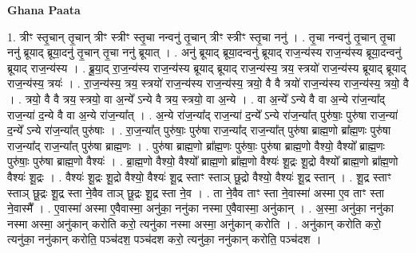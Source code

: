 \documentclass[17pt]{extarticle}
\begin{document}
\textbf{Ghana Paata } \newline

1. त्रीꣳ स्तृ॒चान् तृ॒चान् त्रीꣳ स्त्रीꣳ स्तृ॒चा नन्वनु॑ तृ॒चान् त्रीꣳ स्त्रीꣳ स्तृ॒चा ननु॑ । . तृ॒चा नन्वनु॑ तृ॒चान् तृ॒चा ननु॑ ब्रूयाद् ब्रूया॒दनु॑ तृ॒चान् तृ॒चा ननु॑ ब्रूयात् । . अनु॑ ब्रूयाद् ब्रूया॒दन्वनु॑ ब्रूयाद् राज॒न्य॑स्य राज॒न्य॑स्य ब्रूया॒दन्वनु॑ ब्रूयाद् राज॒न्य॑स्य । . ब्रू॒या॒द् रा॒ज॒न्य॑स्य राज॒न्य॑स्य ब्रूयाद् ब्रूयाद् राज॒न्य॑स्य॒ त्रय॒ स्त्रयो॑ राज॒न्य॑स्य ब्रूयाद् ब्रूयाद् राज॒न्य॑स्य॒ त्रयः॑ । . रा॒ज॒न्य॑स्य॒ त्रय॒ स्त्रयो॑ राज॒न्य॑स्य राज॒न्य॑स्य॒ त्रयो॒ वै वै त्रयो॑ राज॒न्य॑स्य राज॒न्य॑स्य॒ त्रयो॒ वै । . त्रयो॒ वै वै त्रय॒ स्त्रयो॒ वा अ॒न्ये᳚ ऽन्ये वै त्रय॒ स्त्रयो॒ वा अ॒न्ये । . वा अ॒न्ये᳚ ऽन्ये वै वा अ॒न्ये रा॑ज॒न्या᳚द् राज॒न्या॑ द॒न्ये वै वा अ॒न्ये रा॑ज॒न्या᳚त् । . अ॒न्ये रा॑ज॒न्या᳚द् राज॒न्या॑ द॒न्ये᳚ ऽन्ये रा॑ज॒न्या᳚त् पुरु॑षाः॒ पुरु॑षा राज॒न्या॑ द॒न्ये᳚ ऽन्ये रा॑ज॒न्या᳚त् पुरु॑षाः । . रा॒ज॒न्या᳚त् पुरु॑षाः॒ पुरु॑षा राज॒न्या᳚द् राज॒न्या᳚त् पुरु॑षा ब्राह्म॒णो ब्रा᳚ह्म॒णः पुरु॑षा राज॒न्या᳚द् राज॒न्या᳚त् पुरु॑षा ब्राह्म॒णः । . पुरु॑षा ब्राह्म॒णो ब्रा᳚ह्म॒णः पुरु॑षाः॒ पुरु॑षा ब्राह्म॒णो वैश्यो॒ वैश्यो᳚ ब्राह्म॒णः पुरु॑षाः॒ पुरु॑षा ब्राह्म॒णो वैश्यः॑ । . ब्रा॒ह्म॒णो वैश्यो॒ वैश्यो᳚ ब्राह्म॒णो ब्रा᳚ह्म॒णो वैश्यः॑ शू॒द्रः शू॒द्रो वैश्यो᳚ ब्राह्म॒णो ब्रा᳚ह्म॒णो वैश्यः॑ शू॒द्रः । . वैश्यः॑ शू॒द्रः शू॒द्रो वैश्यो॒ वैश्यः॑ शू॒द्र स्ताꣳ स्ताञ् छू॒द्रो वैश्यो॒ वैश्यः॑ शू॒द्र स्तान् । . शू॒द्र स्ताꣳ स्ताञ् छू॒द्रः शू॒द्र स्ता ने॒वैव ताञ् छू॒द्रः शू॒द्र स्ता ने॒व । . ता ने॒वैव ताꣳ स्ता ने॒वास्मा॑ अस्मा ए॒व ताꣳ स्ता ने॒वास्मै᳚ । . ए॒वास्मा॑ अस्मा ए॒वैवास्मा॒ अनु॑का॒ ननु॑का नस्मा ए॒वैवास्मा॒ अनु॑कान् । . अ॒स्मा॒ अनु॑का॒ ननु॑का नस्मा अस्मा॒ अनु॑कान् करोति करो॒ त्यनु॑का नस्मा अस्मा॒ अनु॑कान् करोति । . अनु॑कान् करोति करो॒ त्यनु॑का॒ ननु॑कान् करोति॒ पञ्च॑दश॒ पञ्च॑दश करो॒ त्यनु॑का॒ ननु॑कान् करोति॒ पञ्च॑दश । \newline
\end{document}
